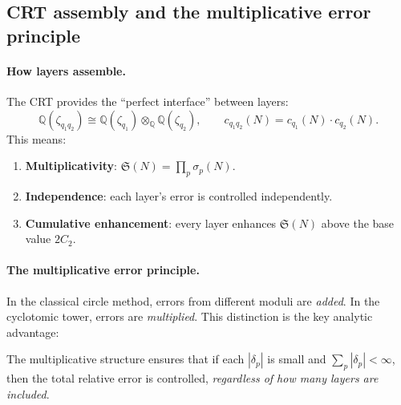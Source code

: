 \documentclass[11pt,a4paper]{article}
\theoremstyle{remark}
\newcommand{\Q}{\mathbb{Q}}
\begin{document}
\subsection{CRT assembly and the multiplicative error principle}
\label{subsec:crt-assembly}

\paragraph{How layers assemble.}
The CRT provides the ``perfect interface'' between layers:
\begin{equation}
\label{eq:crt-assembly}
  \Q(\zeta_{q_1 q_2}) \cong \Q(\zeta_{q_1}) \otimes_\Q \Q(\zeta_{q_2}),
  \qquad
  c_{q_1 q_2}(N) = c_{q_1}(N) \cdot c_{q_2}(N).
\end{equation}
This means:
\begin{enumerate}[nosep]
  \item \textbf{Multiplicativity}: $\mathfrak{S}(N) = \prod_p \sigma_p(N)$.
  \item \textbf{Independence}: each layer's error is controlled
    independently.
  \item \textbf{Cumulative enhancement}: every layer enhances
    $\mathfrak{S}(N)$ above the base value $2C_2$.
\end{enumerate}

\paragraph{The multiplicative error principle.}
In the classical circle method, errors from different moduli are
\emph{added}.  In the cyclotomic tower, errors are \emph{multiplied}.
This distinction is the key analytic advantage:

\medskip
\begin{center}
\end{center}
\medskip

The multiplicative structure ensures that if each $|\delta_p|$ is small
and $\sum_p |\delta_p| < \infty$, then the total relative error is
controlled, \emph{regardless of how many layers are included}.
\end{document}
